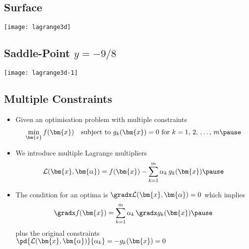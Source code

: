 
\begin{slide}
\section{Surface}

\begin{center}
  \texttt{[image: lagrange3d]}
\end{center}

\end{slide}


\begin{slide}
\section{Saddle-Point $y=-9/8$}

\begin{center}
  \texttt{[image: lagrange3d-1]}
\end{center}

\end{slide}




\begin{slide}
\section[-2.4]{Multiple Constraints}

\begin{PauseHighLight}
  \begin{itemize}
  \item Given an optimisation problem with multiple constraints
    \begin{align*}
      \min_{\bm{x}} f(\bm{x}) \quad \mbox{subject to $g_k(\bm{x})=0$ for
      $k=1,\,2,\,\ldots,\,m$}\pause
    \end{align*}
  \item We introduce multiple Lagrange multipliers
    \begin{align*}
      \mathcal{L}(\bm{x},\bm{\alpha}) 
      = f(\bm{x}) - \sum_{k=1}^m \alpha_k\, g_k(\bm{x})\pause
    \end{align*}
  \item The condition for an optima is $\gradx
    \mathcal{L}(\bm{x},\bm{\alpha}) =0$ which implies
    \begin{align*}
      \gradx f(\bm{x}) = \sum_{k=1}^m  \alpha_k \, \gradx g_k(\bm{x})\pause
    \end{align*}
    plus the original constraints
    $\pd{\mathcal{L}(\bm{x},\bm{\alpha})}{\alpha_k}= -g_k(\bm{x})=0$\pause
  \end{itemize}
\end{PauseHighLight}

\end{slide}

